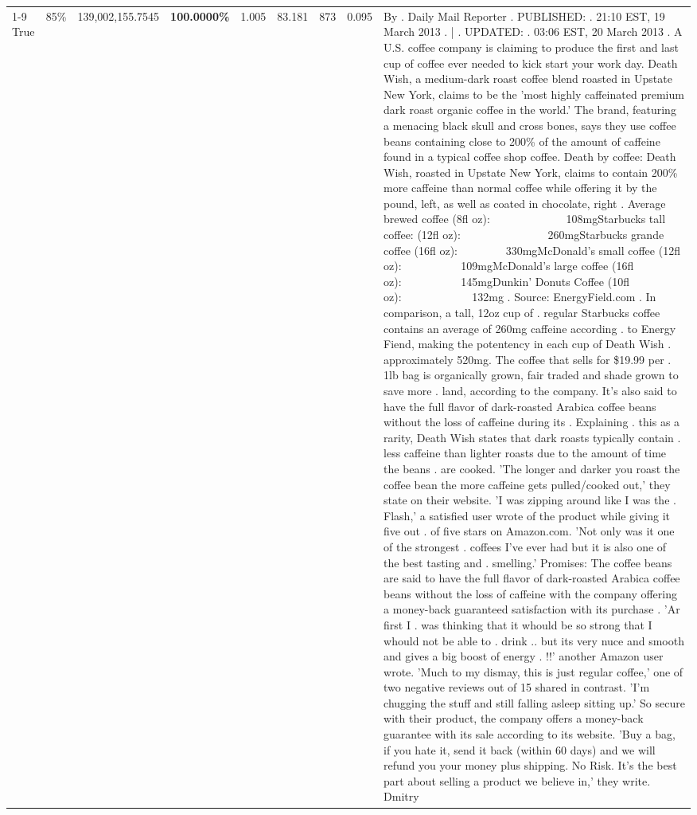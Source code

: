 \begin{table}[H]
{\begin{tabular}{lllrlllll}
\cline{1-9} \cline{2-9}
True & 85\% & 139,002,155.7545 & \bfseries \color{red} 100.0000\% & 1.005 & 83.181 & 873 & 0.095 & By . Daily Mail Reporter . PUBLISHED: . 21:10 EST, 19 March 2013 . | . UPDATED: . 03:06 EST, 20 March 2013 . A U.S. coffee company is claiming to produce the first and last cup of coffee ever needed to kick start your work day. Death Wish, a medium-dark roast coffee blend roasted in Upstate New York, claims to be the 'most highly caffeinated premium dark roast organic coffee in the world.' The brand, featuring a menacing black skull and cross bones, says they use coffee beans containing close to 200\% of the amount of caffeine found in a typical coffee shop coffee. Death by coffee: Death Wish, roasted in Upstate New York, claims to contain 200\% more caffeine than normal coffee while offering it by the pound, left, as well as coated in chocolate, right . Average brewed coffee (8fl oz):              108mgStarbucks tall coffee: (12fl oz):                260mgStarbucks grande coffee (16fl oz):         330mgMcDonald's small coffee (12fl oz):           109mgMcDonald's large coffee (16fl oz):           145mgDunkin' Donuts Coffee (10fl oz):             132mg . Source: EnergyField.com . In comparison, a tall, 12oz cup of . regular Starbucks coffee contains an average of 260mg caffeine according . to Energy Fiend, making the potentency in each cup of Death Wish . approximately 520mg. The coffee that sells for \$19.99 per . 1lb bag is organically grown, fair traded and shade grown to save more . land, according to the company. It's also said to have the full flavor of dark-roasted Arabica coffee beans without the loss of caffeine during its . Explaining . this as a rarity, Death Wish states that dark roasts typically contain . less caffeine than lighter roasts due to the amount of time the beans . are cooked. 'The longer and darker you roast the coffee bean the more caffeine gets pulled/cooked out,' they state on their website. 'I was zipping around like I was the . Flash,' a satisfied user wrote of the product while giving it five out . of five stars on Amazon.com. 'Not only was it one of the strongest . coffees I've ever had but it is also one of the best tasting and . smelling.’ Promises: The coffee beans are said to have the full flavor of dark-roasted Arabica coffee beans without the loss of caffeine with the company offering a money-back guaranteed satisfaction with its purchase . 'Ar first I . was thinking that it whould be so strong that I whould not be able to . drink .. but its very nuce and smooth and gives a big boost of energy . !!' another Amazon user wrote. 'Much to my dismay, this is just regular coffee,' one of two negative reviews out of 15 shared in contrast. 'I'm chugging the stuff and still falling asleep sitting up.' So secure with their product, the company offers a money-back guarantee with its sale according to its website. 'Buy a bag, if you hate it, send it back (within 60 days) and we will refund you your money plus shipping. No Risk. It’s the best part about selling a product we believe in,' they write. Dmitry \\

\end{tabular}}
\end{table}

